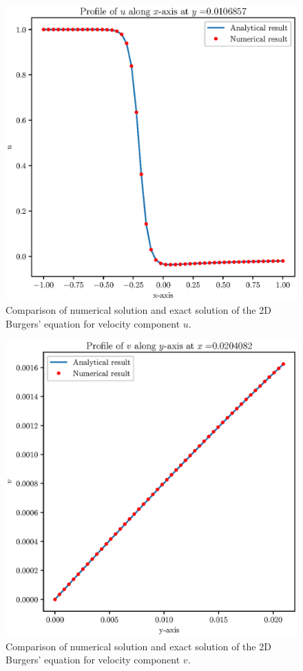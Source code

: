 \documentclass[12pt,a4paper,fleqn]{article}
\begin{document}
\begin{figure}[p!]
\centering
\includegraphics[width=\linewidth]{comparisonU.eps}
\caption{Comparison of numerical solution and exact solution of the 2D Burgers'
equation for velocity component $u$.}
\end{figure}


\begin{figure}[p!]
\centering
\includegraphics[width=\linewidth]{comparisonV.eps}
\caption{Comparison of numerical solution and exact solution of the 2D Burgers'
equation for velocity component $v$.}
\end{figure}
\end{document}

